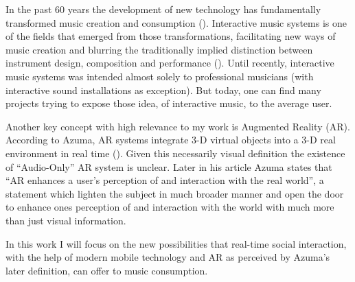 

In the past 60 years the development of new technology has fundamentally transformed music creation and consumption (\cite[]{winkler01}).
Interactive music systems is one of the fields that emerged from those transformations, facilitating new ways of music creation and blurring the traditionally implied distinction between instrument design, composition and performance (\cite{drummond09}).
Until recently, interactive music systems was intended almost solely to professional musicians (with interactive sound installations as exception).
But today, one can find many projects trying to expose those idea, of interactive music, to the average user.

Another key concept with high relevance to my work is Augmented Reality (AR). According to Azuma, AR systems integrate 3-D virtual objects into a 3-D real environment in real time (\cite*{azuma97}).
Given this necessarily visual definition the existence of ``Audio-Only'' AR system is unclear.
Later in his article Azuma states that ``AR enhances a user's perception of and interaction with the real world'', a statement which lighten the subject in much broader manner and open the door to enhance ones perception of and interaction with the world with much more than just visual information.

In this work I will focus on the new possibilities that real-time social interaction, with the help of modern mobile technology and AR as perceived by Azuma's later definition, can offer to music consumption.